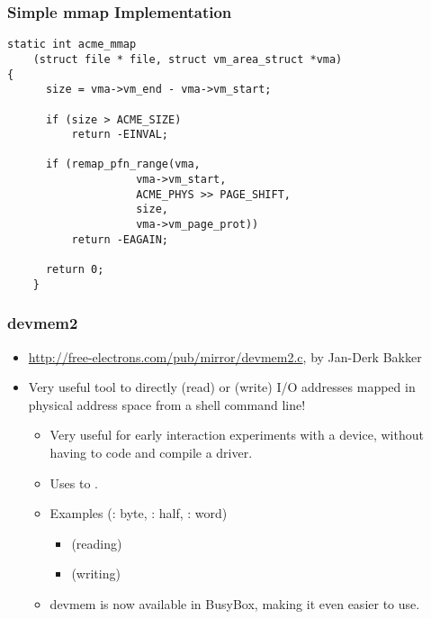 \begin{frame}[fragile]
  \frametitle{Simple mmap Implementation}
  \begin{verbatim}
static int acme_mmap
    (struct file * file, struct vm_area_struct *vma)
{
      size = vma->vm_end - vma->vm_start;

      if (size > ACME_SIZE)
          return -EINVAL;

      if (remap_pfn_range(vma,
                    vma->vm_start,
                    ACME_PHYS >> PAGE_SHIFT,
                    size,
                    vma->vm_page_prot))
          return -EAGAIN;

      return 0;
    }
  \end{verbatim}
\end{frame}

\begin{frame}
  \frametitle{devmem2}
  \begin{itemize}
  \item \url{http://free-electrons.com/pub/mirror/devmem2.c}, by Jan-Derk
    Bakker
  \item Very useful tool to directly  (read) or 
    (write) I/O addresses mapped in physical address space from a
    shell command line!
    \begin{itemize}
    \item Very useful for early interaction experiments with a device,
      without having to code and compile a driver.
    \item Uses  to .
    \item Examples (: byte, : half, : word)
      \begin{itemize}
      \item {} (reading)
      \item {} (writing)
      \end{itemize}
    \item devmem is now available in BusyBox, making it even easier to
      use.
    \end{itemize}
  \end{itemize}
\end{frame}

